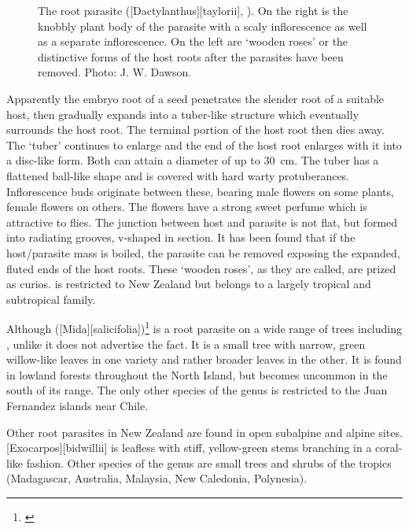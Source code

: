 \begin{figure}[!t]
\begin{minipage}[t]{\textwidth}
\begin{minipage}[t]{(\textwidth-\fgap) * \real{0.548}}
			\caption[The root parasite pua o te reinga (\emph{Dactylanthus taylorii})]{The root parasite  ([Dactylanthus][taylorii], ).
			On the right is the knobbly plant body of the parasite with a scaly inflorescence as well as a separate inflorescence.
			On the left are `wooden roses' or the distinctive forms of the host roots after the parasites have been removed.
			Photo: J. W. Dawson.}%
			\label{fig:58dactylanthus}
		\end{minipage}
	\end{minipage}
\end{figure}

Apparently the embryo root of a  seed penetrates the slender root of a suitable host, then gradually expands into a tuber-like structure which eventually surrounds the host root.
The terminal portion of the host root then dies away.
The `tuber' continues to enlarge and the end of the host root enlarges with it into a disc-like form.
Both can attain a diameter of up to \SI{30}{\centi\metre}.
The tuber has a flattened ball-like shape and is covered with hard warty protuberances.
Inflorescence buds originate between these, bearing male flowers on some plants, female flowers on others.
The flowers have a strong sweet perfume which is attractive to flies.
The junction between host and parasite is not flat, but formed into radiating grooves, v-shaped in section.
It has been found that if the host/parasite mass is boiled, the parasite can be removed exposing the expanded, fluted ends of the host roots.
These `wooden roses', as they are called, are prized as curios.
 is restricted to New Zealand but belongs to a largely tropical and subtropical family.

Although  ([Mida][salicifolia])\footnote{\cite{philipson1959some}} is a root parasite on a wide range of trees including , unlike  it does not advertise the fact.
It is a small tree with narrow, green willow-like leaves in one variety and rather broader leaves in the other.
It is found in lowland forests throughout the North Island, but becomes uncommon in the south of its range.
The only other species of the genus is restricted to the Juan Fernandez islands near Chile.

Other root parasites in New Zealand are found in open subalpine and alpine sites.
[Exocarpos][bidwillii] is leafless with stiff, yellow-green stems branching in a coral-like fashion.
Other species of the genus are small trees and shrubs of the tropics (Madagascar, Australia, Malaysia, New Caledonia, Polynesia).

